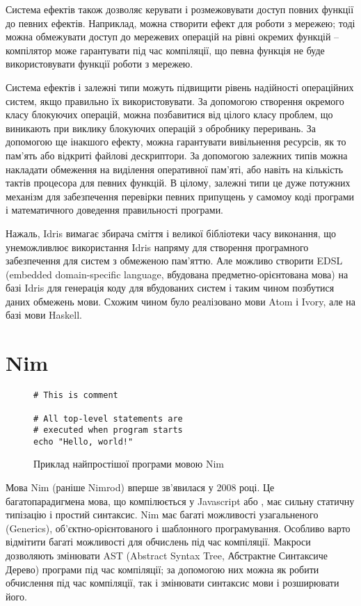\documentclass[main.tex]{subfiles}
\begin{document}
Система ефектів також дозволяє керувати і розмежовувати доступ повних функції до певних ефектів. Наприклад, можна створити ефект для роботи з мережею; тоді можна обмежувати доступ до мережевих операцій на рівні окремих функцій -- компілятор може гарантувати під час компіляції, що певна функція не буде використовувати функції роботи з мережею.

Система ефектів і залежні типи можуть підвищити рівень надійності операційних систем, якщо правильно їх використовувати. За допомогою створення окремого класу блокуючих операцій, можна позбавитися від цілого класу проблем, що виникають при виклику блокуючих операцій з обробнику переривань. За допомогою ще інакшого ефекту, можна гарантувати вивільнення ресурсів, як то пам'ять або відкриті файлові дескриптори. За допомогою залежних типів можна накладати обмеження на виділення оперативної пам'яті, або навіть на кількість тактів процесора для певних функцій. В цілому, залежні типи це дуже потужних механізм для забезпечення перевірки певних припущень у самомоу коді програми і математичного доведення правильності програми.

Нажаль, Idris вимагає збирача сміття і великої бібліотеки часу виконання, що унеможливлює використання Idris напряму для створення програмного забезпечення для систем з обмеженою пам'яттю. Але можливо створити EDSL (embedded domain-specific language, вбудована предметно-орієнтована мова) на базі Idris для генерація коду для вбудованих систем і таким чином позбутися даних обмежень мови. Схожим чином було реалізовано мови Atom\cite{haskell:atom} і Ivory\cite{haskell:ivory}, але на базі мови Haskell\cite{haskell}.

\section{Nim}

\begin{figure}[!bp]
  \centering
  \begin{BVerbatim}
# This is comment

# All top-level statements are
# executed when program starts
echo "Hello, world!"
  \end{BVerbatim}
  \caption{Приклад найпростішої програми мовою Nim}\label{example:nim}
\end{figure}

Мова Nim\cite{nim} (раніше Nimrod) вперше зв'явилася у 2008 році. Це багатопарадигмена мова, що компілюється у Javascript або \LangC{}, має сильну статичну типізацію і простий синтаксис. Nim має багаті можливості узагальненого (Generics), об'єктно-орієнтованого і шаблонного програмування. Особливо варто відмітити багаті можливості для обчислень під час компіляції. Макроси дозволяють змінювати AST (Abstract Syntax Tree, Абстрактне Синтаксиче Дерево) програми під час компіляції; за допомогою них можна як робити обчислення під час компіляції, так і змінювати синтаксис мови і розширювати його.
\end{document}
